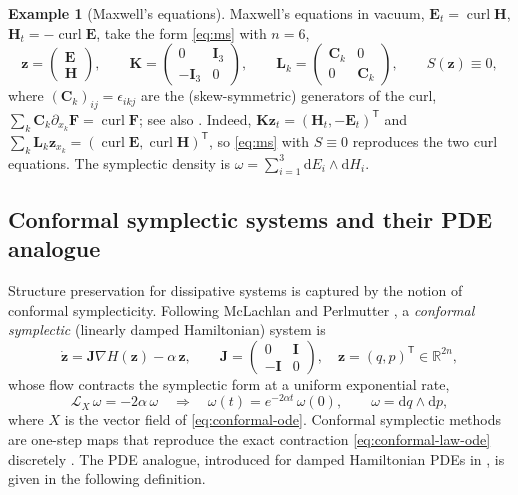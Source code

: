 \documentclass[11pt]{article}
\theoremstyle{definition}
\newtheorem{example}[theorem]{Example}
\theoremstyle{remark}
\newcommand{\R}{\mathbb{R}}
\newcommand{\dd}{\mathrm{d}}
\newcommand{\bz}{\bm{z}}
\newcommand{\bE}{\bm{E}}
\newcommand{\bH}{\bm{H}}
\newcommand{\bK}{\bm{K}}
\newcommand{\bL}{\bm{L}}
\newcommand{\bJ}{\bm{J}}
\newcommand{\bI}{\bm{I}}
\newcommand{\Lie}{\mathcal{L}}
\DeclareMathOperator{\curl}{curl}
\begin{document}
\begin{example}[Maxwell's equations]
\label{ex:maxwell-ms}
Maxwell's equations in vacuum, $\bE_t=\curl\bH$, $\bH_t=-\curl\bE$,
take the form \eqref{eq:ms} with $n=6$,
\begin{equation}
\label{eq:maxwell-ms-matrices}
\bz=\begin{pmatrix}\bE\\ \bH\end{pmatrix},
\qquad
\bK=\begin{pmatrix}0&\bI_3\\ -\bI_3&0\end{pmatrix},
\qquad
\bL_k=\begin{pmatrix}\bm{C}_k&0\\ 0&\bm{C}_k\end{pmatrix},
\qquad
S(\bz)\equiv 0 ,
\end{equation}
where $(\bm{C}_k)_{ij}=\epsilon_{ikj}$ are the (skew-symmetric)
generators of the curl, $\sum_k \bm{C}_k\partial_{x_k}\bm{F}
=\curl\bm{F}$; see also
\cite{sun2019maxwell}.  Indeed,
$\bK\bz_t=(\bH_t,-\bE_t)^{\mathsf T}$ and
$\sum_k\bL_k\bz_{x_k}=(\curl\bE,\curl\bH)^{\mathsf T}$, so
\eqref{eq:ms} with $S\equiv0$ reproduces the two curl equations.  The
symplectic density is $\omega=\sum_{i=1}^3\dd E_i\wedge\dd H_i$.
\end{example}

\subsection{Conformal symplectic systems and their PDE analogue}
\label{subsec:conformal}

Structure preservation for dissipative systems is captured by
the notion of conformal symplecticity.  Following McLachlan and
Perlmutter \cite{mclachlan2001conformal}, a \emph{conformal
symplectic} (linearly damped Hamiltonian) system is
\begin{equation}
\label{eq:conformal-ode}
\dot{\bz} = \bJ\nabla H(\bz) - \alpha\,\bz ,
\qquad
\bJ=\begin{pmatrix}0&\bI\\ -\bI&0\end{pmatrix},
\quad \bz=(q,p)^{\mathsf T}\in\R^{2n},
\end{equation}
whose flow contracts the symplectic form at a uniform exponential
rate,
\begin{equation}
\label{eq:conformal-law-ode}
\Lie_X\,\omega = -2\alpha\,\omega
\quad\Longrightarrow\quad
\omega(t) = e^{-2\alpha t}\,\omega(0),
\qquad \omega = \dd q\wedge \dd p ,
\end{equation}
where $X$ is the vector field of \eqref{eq:conformal-ode}.  Conformal
symplectic methods are one-step maps that reproduce the exact
contraction \eqref{eq:conformal-law-ode} discretely
\cite{mclachlan2001conformal,bhatt2016conformal}.  The PDE analogue,
introduced for damped Hamiltonian PDEs in
\cite{moore2013conformal,bhatt2016conformal}, is given in the following definition.
\end{document}
